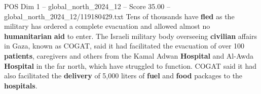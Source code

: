 \begin{textsample}{POS Dim 1 – global\_north\_2024\_12 – Score 35.00 – global\_north\_2024\_12/119180429.txt}
Tens of thousands have \textbf{fled} as the military has ordered a complete evacuation and allowed almost no \textbf{humanitarian} \textbf{aid} to enter.
The Israeli military body overseeing \textbf{civilian} affairs in Gaza, known as COGAT, said it had facilitated the evacuation of over 100 \textbf{patients}, caregivers and others from the Kamal Adwan \textbf{Hospital} and Al-Awda \textbf{Hospital} in the far north, which have struggled to function.
COGAT said it had also facilitated the \textbf{delivery} of 5,000 liters of \textbf{fuel} and \textbf{food} packages to the \textbf{hospitals}.

\end{textsample}
